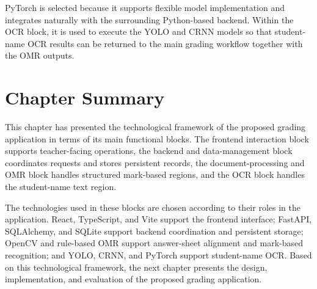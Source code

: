 \documentclass[../Main.tex]{subfiles}
\begin{document}
PyTorch is selected because it supports flexible model implementation and
integrates naturally with the surrounding Python-based backend. Within the OCR
block, it is used to execute the YOLO and CRNN models so that student-name OCR
results can be returned to the main grading workflow together with the OMR
outputs.

\section{Chapter Summary}
\label{section:3.6}

This chapter has presented the technological framework of the proposed grading
application in terms of its main functional blocks. The frontend interaction
block supports teacher-facing operations, the backend and data-management block
coordinates requests and stores persistent records, the document-processing and
OMR block handles structured mark-based regions, and the OCR block handles the
student-name text region.

The technologies used in these blocks are chosen according to their roles in the
application. React, TypeScript, and Vite support the frontend interface;
FastAPI, SQLAlchemy, and SQLite support backend coordination and persistent
storage; OpenCV and rule-based OMR support answer-sheet alignment and
mark-based recognition; and YOLO, CRNN, and PyTorch support student-name OCR.
Based on this technological framework, the next chapter presents the design,
implementation, and evaluation of the proposed grading application.
\end{document}
